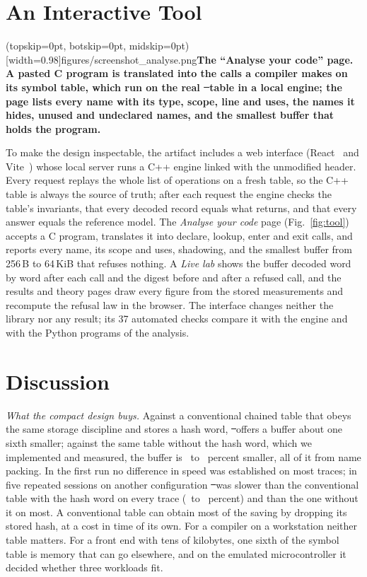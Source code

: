 \section{An Interactive Tool}
\label{sec:tool}
\Figure[t!](topskip=0pt, botskip=0pt, midskip=0pt)[width=0.98\columnwidth]{figures/screenshot_analyse.png}{\textbf{The ``Analyse your code'' page. A pasted C program is translated into the calls a compiler makes on its symbol table, which run on the real \st\ table in a local engine; the page lists every name with its type, scope, line and uses, the names it hides, unused and undeclared names, and the smallest buffer that holds the program.}\label{fig:tool}}

To make the design inspectable, the artifact includes a web interface (React~\cite{react} and Vite~\cite{vite}) whose local server runs a C++ engine linked with the unmodified header. Every request replays the whole list of operations on a fresh table, so the C++ table is always the source of truth; after each request the engine checks the table's invariants, that every decoded record equals what  returns, and that every answer equals the reference model. The \emph{Analyse your code} page (Fig.~\ref{fig:tool}) accepts a C program, translates it into declare, lookup, enter and exit calls, and reports every name, its scope and uses, shadowing, and the smallest buffer from 256\,B to 64\,KiB that refuses nothing. A \emph{Live lab} shows the buffer decoded word by word after each call and the digest before and after a refused call, and the results and theory pages draw every figure from the stored measurements and recompute the refusal law in the browser. The interface changes neither the library nor any result; its 37 automated checks compare it with the engine and with the Python programs of the analysis.

\section{Discussion}
\label{sec:discussion}

\emph{What the compact design buys.} Against a conventional chained table that obeys the same storage discipline and stores a hash word, \st\ offers a buffer about one sixth smaller; against the same table without the hash word, which we implemented and measured, the buffer is \ConeSaveLo\ to \ConeSaveHi\ percent smaller, all of it from name packing. In the first run no difference in speed was established on most traces; in five repeated sessions on another configuration \st\ was slower than the conventional table with the hash word on every trace (\SessSZeroLo\ to \SessSZeroHi\ percent) and than the one without it on most. A conventional table can obtain most of the saving by dropping its stored hash, at a cost in time of its own. For a compiler on a workstation neither table matters. For a front end with tens of kilobytes, one sixth of the symbol table is memory that can go elsewhere, and on the emulated microcontroller it decided whether three workloads fit.

